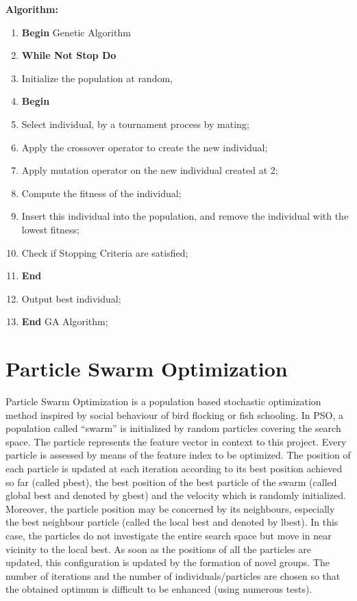 \documentclass[a4paper,12pt]{report}
\begin{document}
\begin{flushleft}
\noindent \textbf{Algorithm:}\\
\begin{enumerate}
\item \textbf{Begin} Genetic Algorithm
\item \textbf{While Not Stop Do}
\item Initialize the population at random,
\item \textbf{Begin}
\item  Select individual, by a tournament process by mating;
\item  Apply the crossover operator to create the new individual;
\item  Apply mutation operator on the new individual created at 2;
\item  Compute the fitness of the individual;
\item  Insert this individual into the population, and remove the individual with the lowest fitness;
\item  Check if Stopping Criteria are satisfied;
\item \textbf{End}
\item Output best individual;
\item \textbf{End} GA Algorithm;
\end{enumerate}
\end{flushleft}
\pagebreak

\section{Particle Swarm Optimization}
Particle Swarm Optimization is a population based stochastic optimization method inspired by social behaviour of bird flocking or fish schooling. In PSO, a population called “swarm” is initialized by random particles covering the search space. The particle represents the feature vector in context to this project. Every particle is assessed by means of the feature index to be optimized. The position of each particle is updated at each iteration according to its best position achieved so far (called pbest), the best position of the best particle of the swarm (called global best and denoted by gbest) and the velocity which is randomly initialized. Moreover, the particle position may be concerned by its neighbours, especially the best neighbour particle (called the local best and denoted by lbest). In this case, the particles do not investigate the entire search space but move in near vicinity to the local best. As soon as the positions of all the particles are updated, this configuration is updated by the formation of novel groups. The number of iterations and the number of individuals/particles are chosen so that the obtained optimum is difficult to be enhanced (using numerous tests).
\end{document}
